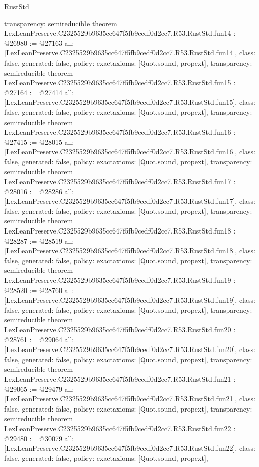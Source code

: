 \begin{lexlean}{RustStd}
\begin{coremodule}
{  transparency: semireducible
}
theorem LexLeanPreserve.C2325529b9635cc647f5fb9cedf0d2cc7.R53.RustStd.fun14 : @26980 := @27163 {
  all: [LexLeanPreserve.C2325529b9635cc647f5fb9cedf0d2cc7.R53.RustStd.fun14],
  class: false,
  generated: false,
  policy: exact{axioms: [Quot.sound, propext]},
  transparency: semireducible
}
theorem LexLeanPreserve.C2325529b9635cc647f5fb9cedf0d2cc7.R53.RustStd.fun15 : @27164 := @27414 {
  all: [LexLeanPreserve.C2325529b9635cc647f5fb9cedf0d2cc7.R53.RustStd.fun15],
  class: false,
  generated: false,
  policy: exact{axioms: [Quot.sound, propext]},
  transparency: semireducible
}
theorem LexLeanPreserve.C2325529b9635cc647f5fb9cedf0d2cc7.R53.RustStd.fun16 : @27415 := @28015 {
  all: [LexLeanPreserve.C2325529b9635cc647f5fb9cedf0d2cc7.R53.RustStd.fun16],
  class: false,
  generated: false,
  policy: exact{axioms: [Quot.sound, propext]},
  transparency: semireducible
}
theorem LexLeanPreserve.C2325529b9635cc647f5fb9cedf0d2cc7.R53.RustStd.fun17 : @28016 := @28286 {
  all: [LexLeanPreserve.C2325529b9635cc647f5fb9cedf0d2cc7.R53.RustStd.fun17],
  class: false,
  generated: false,
  policy: exact{axioms: [Quot.sound, propext]},
  transparency: semireducible
}
theorem LexLeanPreserve.C2325529b9635cc647f5fb9cedf0d2cc7.R53.RustStd.fun18 : @28287 := @28519 {
  all: [LexLeanPreserve.C2325529b9635cc647f5fb9cedf0d2cc7.R53.RustStd.fun18],
  class: false,
  generated: false,
  policy: exact{axioms: [Quot.sound, propext]},
  transparency: semireducible
}
theorem LexLeanPreserve.C2325529b9635cc647f5fb9cedf0d2cc7.R53.RustStd.fun19 : @28520 := @28760 {
  all: [LexLeanPreserve.C2325529b9635cc647f5fb9cedf0d2cc7.R53.RustStd.fun19],
  class: false,
  generated: false,
  policy: exact{axioms: [Quot.sound, propext]},
  transparency: semireducible
}
theorem LexLeanPreserve.C2325529b9635cc647f5fb9cedf0d2cc7.R53.RustStd.fun20 : @28761 := @29064 {
  all: [LexLeanPreserve.C2325529b9635cc647f5fb9cedf0d2cc7.R53.RustStd.fun20],
  class: false,
  generated: false,
  policy: exact{axioms: [Quot.sound, propext]},
  transparency: semireducible
}
theorem LexLeanPreserve.C2325529b9635cc647f5fb9cedf0d2cc7.R53.RustStd.fun21 : @29065 := @29479 {
  all: [LexLeanPreserve.C2325529b9635cc647f5fb9cedf0d2cc7.R53.RustStd.fun21],
  class: false,
  generated: false,
  policy: exact{axioms: [Quot.sound, propext]},
  transparency: semireducible
}
theorem LexLeanPreserve.C2325529b9635cc647f5fb9cedf0d2cc7.R53.RustStd.fun22 : @29480 := @30079 {
  all: [LexLeanPreserve.C2325529b9635cc647f5fb9cedf0d2cc7.R53.RustStd.fun22],
  class: false,
  generated: false,
  policy: exact{axioms: [Quot.sound, propext]},
}
\end{coremodule}
\end{lexlean}
